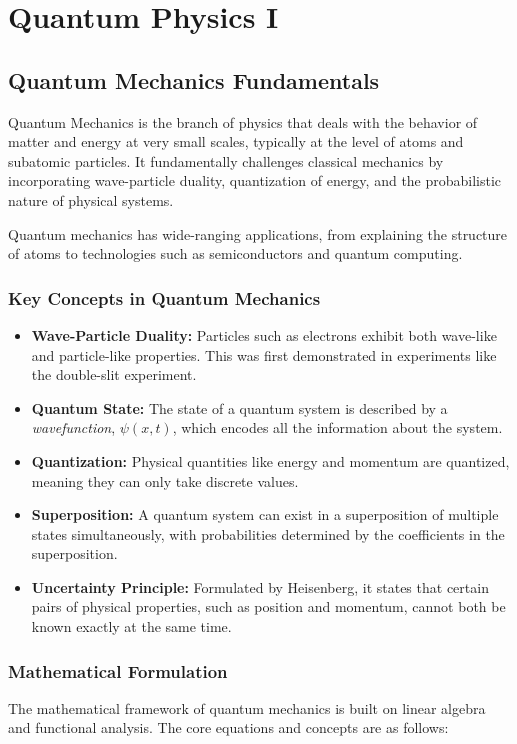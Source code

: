 \chapter{Quantum Physics I}

\section{Quantum Mechanics Fundamentals}

Quantum Mechanics is the branch of physics that deals with the behavior of matter and energy at very small scales, typically at the level of atoms and subatomic particles. It fundamentally challenges classical mechanics by incorporating wave-particle duality, quantization of energy, and the probabilistic nature of physical systems.

Quantum mechanics has wide-ranging applications, from explaining the structure of atoms to technologies such as semiconductors and quantum computing.

\subsection{Key Concepts in Quantum Mechanics}
\begin{itemize}
    \item \textbf{Wave-Particle Duality:} Particles such as electrons exhibit both wave-like and particle-like properties. This was first demonstrated in experiments like the double-slit experiment.
    \item \textbf{Quantum State:} The state of a quantum system is described by a \textit{wavefunction}, $\psi(x,t)$, which encodes all the information about the system.
    \item \textbf{Quantization:} Physical quantities like energy and momentum are quantized, meaning they can only take discrete values.
    \item \textbf{Superposition:} A quantum system can exist in a superposition of multiple states simultaneously, with probabilities determined by the coefficients in the superposition.
    \item \textbf{Uncertainty Principle:} Formulated by Heisenberg, it states that certain pairs of physical properties, such as position and momentum, cannot both be known exactly at the same time.
\end{itemize}

\subsection{Mathematical Formulation}
The mathematical framework of quantum mechanics is built on linear algebra and functional analysis. The core equations and concepts are as follows:

